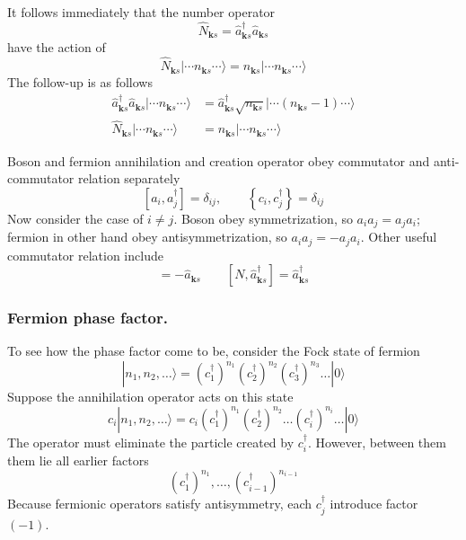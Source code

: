 \documentclass[../../../main.tex]{subfiles}
\begin{document}
It follows immediately that the number operator
\begin{equation*}
  \hat{N }_{\mathbf{k }s } = \hat{a } ^\dagger_{\mathbf{k }s }\hat{a }_{\mathbf{k }s}
\end{equation*}
have the action of
\begin{equation*}
  \hat{N}_{\mathbf{k }s} | \cdots n_{\mathbf{k }s} \cdots \rangle = n_{\mathbf{k }s}  | \cdots n_{\mathbf{k }s}  \cdots \rangle
\end{equation*}
The follow-up is as follows
\begin{align*}
  \hat{a}^\dagger_{\mathbf{k }s} \hat{a}_{\mathbf{k }s} | \cdots n_{\mathbf{k}s} \cdots \rangle
   & =  \hat{a }^\dagger_{\mathbf{k }s}\sqrt{n_{\mathbf{k}s}} | \cdots (n_{\mathbf{k}s} - 1) \cdots \rangle \\
  \hat{N }_{\mathbf{k }s}| \cdots n_{\mathbf{k}s} \cdots \rangle
   & =  n_{\mathbf{k}s} | \cdots n_{\mathbf{k}s} \cdots \rangle
\end{align*}

Boson and fermion annihilation and creation operator obey commutator and anti-commutator relation separately 
\begin{equation*}
  \left[a_i,a_j ^\dagger\right] = \delta_{ij},\qquad
  \left\{ c_i,c_j  ^\dagger\right\} = \delta_{ij} 
\end{equation*}
Now consider the case of $i \neq j$.
Boson obey symmetrization, so $a_ia_j=a_ja_i$; fermion in other hand obey antisymmetrization, so $a_ia_j=-a_ja_i$.
Other useful commutator relation include
\begin{equation*}
 [N,\hat{a}_{\mathbf{k }s} ] = - \hat{a}_{\mathbf{k }s} \qquad
 [N,\hat{a}_{\mathbf{k }s} ^\dagger] = \hat{a}_{\mathbf{k }s} ^\dagger
\end{equation*}

\subsubsection{Fermion phase factor.}
To see how the phase factor come to be, consider the Fock state of fermion
\begin{equation*}
|n_1,n_2,\dots\rangle = (c_1^\dagger)^{n_1}(c_2^\dagger)^{n_2}(c_3^\dagger)^{n_3}\dots|0\rangle  
\end{equation*}
Suppose the annihilation operator acts on this state
\begin{equation*}
  c_i|n_1,n_2,\dots\rangle = c_i (c_1^\dagger)^{n_1}(c_2^\dagger)^{n_2}\dots(c_i^\dagger)^{n_i}\dots|0\rangle
\end{equation*}
The operator must eliminate the particle created by $c_i ^\dagger$.
However, between them them lie all earlier factors
\begin{equation*}
  (c_1 ^\dagger)^{n_1}, \ldots, (c_{i-1}^\dagger)^{n_{i-1}}
\end{equation*}
Because fermionic operators satisfy antisymmetry, each $c_j ^\dagger$ introduce factor $(-1)$.
\end{document}
